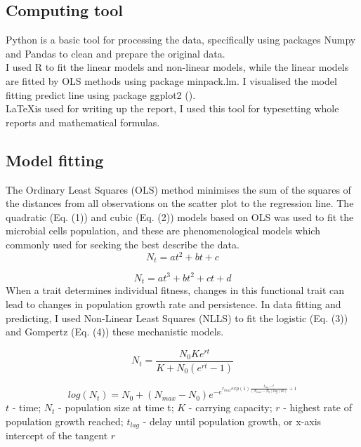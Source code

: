 \documentclass[11pt]{article}
\begin{document}
\subsection{Computing tool}
Python is a basic tool for processing the data, specifically using packages Numpy and Pandas to clean and prepare the original data.\\
I used R to fit the linear models and non-linear models, while the linear models are fitted by OLS methods using package minpack.lm.
I visualised the model fitting predict line using package ggplot2 (\cite{ggplot2_citation}).\\
\LaTeX is used for writing up the report, I used this tool for typesetting whole reports and mathematical formulas.\\ 
\subsection{Model fitting}
The Ordinary Least Squares (OLS) method minimises the sum of the squares of the distances from all observations on the scatter plot to the regression line.
The quadratic (Eq. (1)) and cubic (Eq. (2)) models based on OLS was used to fit the microbial cells population,
and these are phenomenological models which commonly used for seeking the best describe the data.
	\begin{equation}
		N_t = at^2 + bt + c
	\end{equation}
	
	\begin{equation}
		N_t = at^3 + bt^2 + ct + d
	\end{equation}
When a trait determines individual fitness, changes in this functional trait can lead to changes in population growth rate and persistence. 
In data fitting and predicting, I used Non-Linear Least Squares (NLLS) to fit the logistic (Eq. (3)) and Gompertz (Eq. (4)) these mechanistic models.

 
	\begin{equation}
		N_t = \frac{N_0Ke^{rt}}{K + N_0(e^{rt} - 1)}
	\end{equation}
	
	\begin{equation}
		log(N_t) = N_0 + (N_{max} - N_0)e^{-e^{r_{max}exp(1)\frac{t_{lag}-t}{(N_{max}-N_0)log(10)}+1}}
	\end{equation}
	$t$ - time; $N_t$ - population size at time t; $K$ - carrying capacity; $r$ - highest rate of population growth reached; $t_{lag}$ - delay until population growth, or x-axis intercept of the tangent $r$
\end{document}
